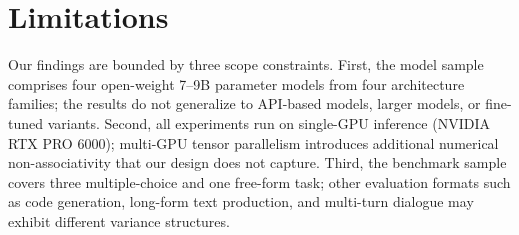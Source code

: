 \section{Limitations}
\label{sec:limitations}

Our findings are bounded by three scope constraints. First, the model sample comprises four open-weight 7--9B parameter models from four architecture families; the results do not generalize to API-based models, larger models, or fine-tuned variants. Second, all experiments run on single-GPU inference (NVIDIA RTX PRO 6000); multi-GPU tensor parallelism introduces additional numerical non-associativity that our design does not capture. Third, the benchmark sample covers three multiple-choice and one free-form task; other evaluation formats such as code generation, long-form text production, and multi-turn dialogue may exhibit different variance structures.
